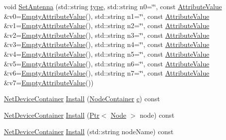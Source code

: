 \begin{DoxyCompactItemize}
\item 
void \hyperlink{classns3_1_1WaveformGeneratorHelper_ae7fc442f01bcc7ac3690c72a03cea82e}{Set\+Antenna} (std\+::string \hyperlink{visualizer-ideas_8txt_add98db9e15e2a58cf2b57623e7aa893a}{type}, std\+::string n0=\char`\"{}\char`\"{}, const \hyperlink{classns3_1_1AttributeValue}{Attribute\+Value} \&v0=\hyperlink{classns3_1_1EmptyAttributeValue}{Empty\+Attribute\+Value}(), std\+::string n1=\char`\"{}\char`\"{}, const \hyperlink{classns3_1_1AttributeValue}{Attribute\+Value} \&v1=\hyperlink{classns3_1_1EmptyAttributeValue}{Empty\+Attribute\+Value}(), std\+::string n2=\char`\"{}\char`\"{}, const \hyperlink{classns3_1_1AttributeValue}{Attribute\+Value} \&v2=\hyperlink{classns3_1_1EmptyAttributeValue}{Empty\+Attribute\+Value}(), std\+::string n3=\char`\"{}\char`\"{}, const \hyperlink{classns3_1_1AttributeValue}{Attribute\+Value} \&v3=\hyperlink{classns3_1_1EmptyAttributeValue}{Empty\+Attribute\+Value}(), std\+::string n4=\char`\"{}\char`\"{}, const \hyperlink{classns3_1_1AttributeValue}{Attribute\+Value} \&v4=\hyperlink{classns3_1_1EmptyAttributeValue}{Empty\+Attribute\+Value}(), std\+::string n5=\char`\"{}\char`\"{}, const \hyperlink{classns3_1_1AttributeValue}{Attribute\+Value} \&v5=\hyperlink{classns3_1_1EmptyAttributeValue}{Empty\+Attribute\+Value}(), std\+::string n6=\char`\"{}\char`\"{}, const \hyperlink{classns3_1_1AttributeValue}{Attribute\+Value} \&v6=\hyperlink{classns3_1_1EmptyAttributeValue}{Empty\+Attribute\+Value}(), std\+::string n7=\char`\"{}\char`\"{}, const \hyperlink{classns3_1_1AttributeValue}{Attribute\+Value} \&v7=\hyperlink{classns3_1_1EmptyAttributeValue}{Empty\+Attribute\+Value}())
\item 
\hyperlink{classns3_1_1NetDeviceContainer}{Net\+Device\+Container} \hyperlink{classns3_1_1WaveformGeneratorHelper_a61d491cf9b6488bf5ff1b7ae2f245eb0}{Install} (\hyperlink{classns3_1_1NodeContainer}{Node\+Container} \hyperlink{mmwave_2model_2fading-traces_2fading__trace__generator_8m_ae0323a9039add2978bf5b49550572c7c}{c}) const 
\item 
\hyperlink{classns3_1_1NetDeviceContainer}{Net\+Device\+Container} \hyperlink{classns3_1_1WaveformGeneratorHelper_a2b41faa0c83b758aaa8d90d08bcffeb5}{Install} (\hyperlink{classns3_1_1Ptr}{Ptr}$<$ \hyperlink{classns3_1_1Node}{Node} $>$ node) const 
\item 
\hyperlink{classns3_1_1NetDeviceContainer}{Net\+Device\+Container} \hyperlink{classns3_1_1WaveformGeneratorHelper_af8d69010d8970a40eba9bc2b7db76af8}{Install} (std\+::string node\+Name) const 
\end{DoxyCompactItemize}

